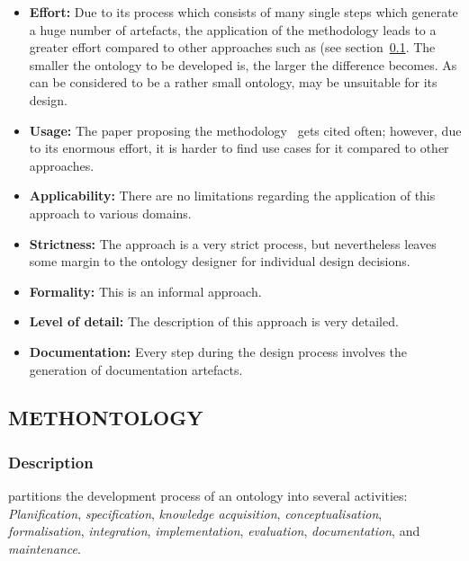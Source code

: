 \begin{itemize}
  \item \textbf{Effort:} Due to its process which consists of many single steps which generate a huge number of artefacts, the application of the  methodology leads to a greater effort compared to other approaches such as \methontology (see section~\ref{subsec:approach5}. The smaller the ontology to be developed is, the larger the difference becomes. As \smarthomeweather can be considered to be a rather small ontology,  may be unsuitable for its design.
  
   \item \textbf{Usage:} The paper proposing the  methodology~\cite{SoftwareEngineeringOntology} gets cited often; however, due to its enormous effort, it is harder to find use cases for it compared to other approaches.

  \item \textbf{Applicability:} There are no limitations regarding the application of this approach to various domains.
  
  \item \textbf{Strictness:} The  approach is a very strict process, but nevertheless leaves some margin to the ontology designer for individual design decisions.
  
  \item \textbf{Formality:} This is an informal approach.
  
  \item \textbf{Level of detail:} The description of this approach is very detailed.
  
  \item \textbf{Documentation:} Every step during the design process involves the generation of documentation artefacts.
\end{itemize}

\subsection{METHONTOLOGY}
\label{subsec:approach5}

\subsubsection{Description}

\methontology partitions the development process of an ontology into several activities: \emph{Planification}, \emph{specification}, \emph{knowledge acquisition}, \emph{conceptualisation}, \emph{formalisation}, \emph{integration}, \emph{implementation}, \emph{evaluation}, \emph{documentation}, and \emph{maintenance}.

